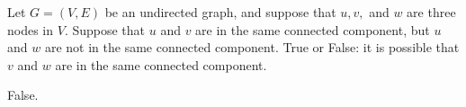 \begin{prob}
    Let $G = (V, E)$ be an undirected graph, and suppose that $u, v, $ and $w$
    are three nodes in $V$. Suppose that $u$ and $v$ are in the same connected component,
    but $u$ and $w$ are not in the same connected component. True or False: it
    is possible that $v$ and $w$ are in the same connected component.

    \tF{}

    \begin{soln}
        False.
    \end{soln}
\end{prob}
